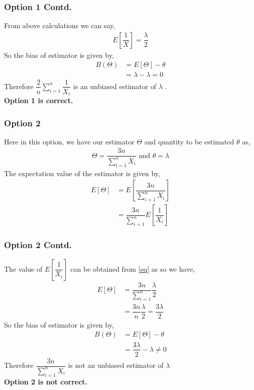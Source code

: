 \documentclass{beamer}
\begin{document}
\begin{frame}
\frametitle{Option 1 Contd.}
From above calculations we can say,
\begin{align}
    E  \left[ \dfrac{1}{X}  \right] = \dfrac{\lambda}{2}
    \label{eq}
\end{align}
So the bias of estimator is given by,
\begin{align}
    B(\Theta) &= E[\Theta] - \theta  \\
    &= \lambda - \lambda = 0
\end{align}
Therefore $\dfrac{2}{n} \sum_{i=1}^{n} \dfrac{1}{X_i} $ is an unbiased estimator of $ \lambda$ .\\
\textbf{Option 1 is correct.} \\
\end{frame}

\begin{frame}
\frametitle{Option 2}
Here in this option, we have our estimator $ \Theta$ and quantity to be estimated $ \theta $ as,
 \begin{align}
     \Theta = \dfrac{3n}{\sum_{i=1}^{n} X_i } \text{  and  }
     \theta = \lambda
 \end{align}
 The expectation value of the estimator is given by, 
\begin{align}
    E[\Theta ] &= E  \left[   \dfrac{3n}{\sum_{i=1}^{n} X_i }  \right] \\
    & = \dfrac{3n}{\sum_{i=1}^{n}}  E  \left[ \dfrac{1}{X_i}  \right] 
\end{align}
\end{frame}
\begin{frame}
   \frametitle{Option 2 Contd.} 
The value of $  E  \left[ \dfrac{1}{X_i}  \right]  $ can be obtained from \eqref{eq} as so we have,
\begin{align}
     E[\Theta ] &= \dfrac{3n}{\sum_{i=1}^{n}} \dfrac{\lambda}{2} \\
     &= \dfrac{3n}{n} \dfrac{\lambda}{2}
     = \dfrac{3\lambda}{2}
\end{align}
So the bias of estimator is given by,
\begin{align}
    B(\Theta) &= E[\Theta] - \theta  \\
    &= \dfrac{3\lambda}{2}- \lambda  \neq 0
    \label{eqbias2}
\end{align}
Therefore $ \dfrac{3n}{\sum_{i=1}^{n} X_i } $ is not an unbiased estimator of $ \lambda$ \\
\textbf{Option 2 is not correct.}
\end{frame}
\end{document}
